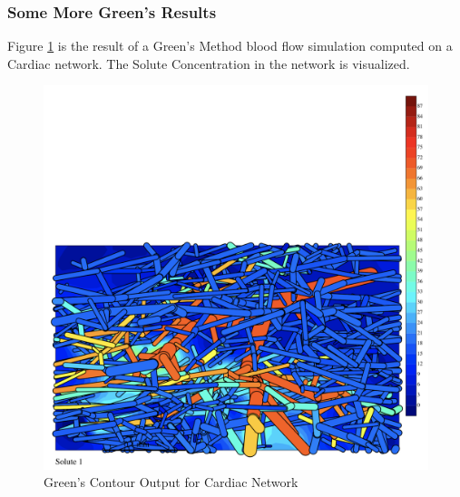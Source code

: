 \subsubsection{Some More Green's Results}

Figure \ref{fig:Contour_Cardiac}  is the result of a Green's Method blood flow simulation computed on a Cardiac network. The Solute Concentration in the network is visualized.\\
\begin{figure}[h]
\centering
\includegraphics[width=170mm]{Contour_Cardiac}
\caption{Green's Contour Output for Cardiac Network}
\label{fig:Contour_Cardiac}
\end{figure}
\\
